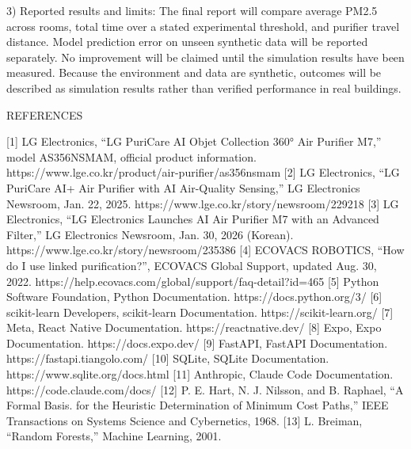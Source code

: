 3) Reported results and limits: 
The final report will compare average PM2.5 across rooms, total time over a stated experimental threshold, and purifier travel distance. Model prediction error on unseen synthetic data will be reported separately. No improvement will be claimed until the simulation results have been measured. Because the environment and data are synthetic, outcomes will be described as simulation results rather than verified performance in real buildings.



REFERENCES

[1] LG Electronics, “LG PuriCare AI Objet Collection 360° Air Purifier M7,” model AS356NSMAM, official product information. https://www.lge.co.kr/product/air-purifier/as356nsmam
[2] LG Electronics, “LG PuriCare AI+ Air Purifier with AI Air-Quality Sensing,” LG Electronics Newsroom, Jan. 22, 2025. https://www.lge.co.kr/story/newsroom/229218
[3] LG Electronics, “LG Electronics Launches AI Air Purifier M7 with an Advanced Filter,” LG Electronics Newsroom, Jan. 30, 2026 (Korean). https://www.lge.co.kr/story/newsroom/235386
[4] ECOVACS ROBOTICS, “How do I use linked purification?”, ECOVACS Global Support, updated Aug. 30, 2022. https://help.ecovacs.com/global/support/faq-detail?id=465
[5] Python Software Foundation, Python Documentation.
https://docs.python.org/3/
[6] scikit-learn Developers, scikit-learn Documentation. https://scikit-learn.org/
[7] Meta, React Native Documentation. https://reactnative.dev/
[8] Expo, Expo Documentation. https://docs.expo.dev/
[9] FastAPI, FastAPI Documentation.
https://fastapi.tiangolo.com/
[10] SQLite, SQLite Documentation. 
https://www.sqlite.org/docs.html
[11] Anthropic, Claude Code Documentation. 
https://code.claude.com/docs/
[12] P. E. Hart, N. J. Nilsson, and B. Raphael, “A Formal Basis. for the Heuristic Determination of Minimum Cost Paths,” IEEE Transactions on Systems Science and Cybernetics, 1968.
[13] L. Breiman, “Random Forests,” Machine Learning, 2001.


 

